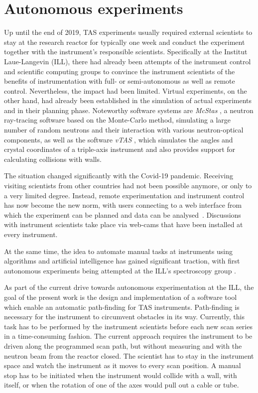 \section{Autonomous experiments \label{sec:autonomous}}

Up until the end of 2019, TAS experiments usually required external scientists to stay at the research reactor for
typically one week and conduct the experiment together with the instrument's responsible scientists. Specifically
at the Institut Laue-Langevin (ILL), there had already been attempts \cite{Song2020} of the instrument control
and scientific computing groups to convince the instrument scientists of the benefits of instrumentation with full- or
semi-autonomous as well as remote control. Nevertheless, the impact had been limited.
Virtual experiments, on the other hand, had already been established in the simulation of actual experiments and in their
planning phase. Noteworthy software systems are \textit{McStas} \cite{McStas2020, McStas2021}, a neutron ray-tracing software based on the
Monte-Carlo method, simulating a large number of random neutrons and their interaction with various neutron-optical components,
as well as the software \textit{vTAS} \cite{vTAS2013}, which simulates the angles and crystal coordinates of a triple-axis
instrument and also provides support for calculating collisions with walls.

The situation changed significantly with the Covid-19 pandemic. Receiving visiting scientists from other countries had
not been possible anymore, or only to a very limited degree. Instead, remote experimentation and instrument control has
now become the new norm, with users connecting to a web interface from which the experiment can be planned and data can
be analysed~\cite{web_ill_visa}.
Discussions with instrument scientists take place via web-cams that have been installed at every instrument.

At the same time, the idea to automate manual tasks at instruments using algorithms and artificial intelligence has
gained significant traction, with first autonomous experiments being attempted at the ILL's spectroscopy group
\cite{web_ill_autonomous2020, Noack2021}.

As part of the current drive towards autonomous experimentation at the ILL, the goal of the present work is the design
and implementation of a software tool which enable an automatic path-finding for TAS instruments. Path-finding
is necessary for the instrument to circumvent obstacles in its way.
Currently, this task has to be performed by the instrument scientists before each new scan series in a time-consuming fashion.
The current approach requires the instrument to be driven along the programmed scan path, but without measuring and with
the neutron beam from the reactor closed.
The scientist has to stay in the instrument space and watch the instrument as it moves to every scan position.
A manual stop has to be initiated when the instrument would collide with a wall, with itself, or when the rotation of one
of the axes would pull out a cable or tube.



